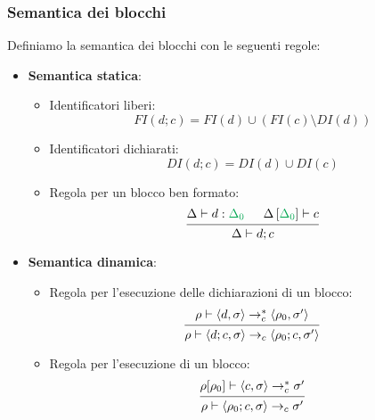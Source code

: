 \documentclass[a4paper]{article}
\begin{document}
\subsubsection{Semantica dei blocchi}
Definiamo la semantica dei blocchi con le seguenti regole:
\begin{itemize}
  \item \textbf{Semantica statica}:
    \begin{itemize}
      \item Identificatori liberi:
        \[
          FI(d;c) = FI(d) \cup (FI(c) \setminus DI(d))
        \] 

      \item Identificatori dichiarati:
        \[
          DI(d;c) = DI(d) \cup DI(c)
        \]

      \item Regola per un blocco ben formato:
        \[
          \begin{prooftree}
            \hypo{
              \Delta \vdash d : \mathcolor{Green}{\Delta_0}
            }
            \hypo{
              \Delta\left[ \mathcolor{Green}{\Delta_0} \right] \vdash c
            }
            \infer2{ 
              \Delta \vdash d;c
            }
          \end{prooftree}
        \] 
    \end{itemize}

  \item \textbf{Semantica dinamica}:
    \begin{itemize}
      \item Regola per l'esecuzione delle dichiarazioni di un blocco:
        \[
          \begin{prooftree}
            \hypo{ 
              \rho \vdash \left< d, \sigma \right>
              \to_c^*
              \left< \rho_0, \sigma' \right>
            }
            \infer1{
              \rho \vdash \left< d;c, \sigma \right>
              \to_c
              \left< \rho_0; c, \sigma' \right>
            }
          \end{prooftree}
        \] 

      \item Regola per l'esecuzione di un blocco:
        \[
          \begin{prooftree}
            \hypo{ 
              \rho[\rho_0] \vdash \left< c, \sigma \right>
              \to_c^*
              \sigma'
            }
            \infer1{ 
              \rho \vdash \left< \rho_0;c, \sigma \right>
              \to_c
              \sigma'
            }
          \end{prooftree}
        \] 
    \end{itemize}
\end{itemize}
\end{document}
